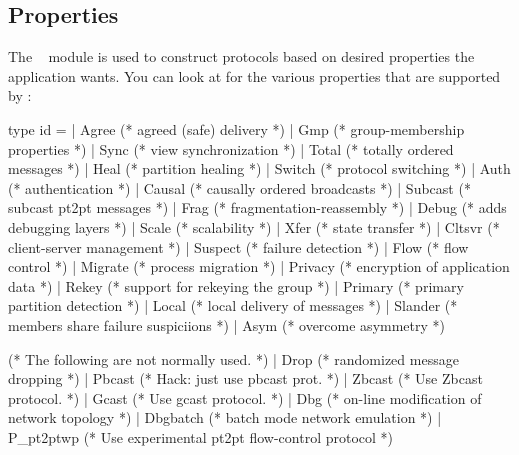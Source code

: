 %
%
%
\subsection{Properties}
\label{sec:properties}

The \ensemble\  module is used to construct protocols based on
desired properties the application wants.  You can look at 
for the various properties that are supported by \ensemble:
\begin{codebox}
type id =
  | Agree       (* agreed (safe) delivery *)
  | Gmp	        (* group-membership properties *)
  | Sync        (* view synchronization *)
  | Total       (* totally ordered messages *)
  | Heal        (* partition healing *)
  | Switch      (* protocol switching *)
  | Auth        (* authentication *)
  | Causal      (* causally ordered broadcasts *)
  | Subcast     (* subcast pt2pt messages *)
  | Frag        (* fragmentation-reassembly *)
  | Debug       (* adds debugging layers *)
  | Scale       (* scalability *)
  | Xfer        (* state transfer *)
  | Cltsvr      (* client-server management *)
  | Suspect     (* failure detection *)
  | Flow        (* flow control *)
  | Migrate     (* process migration *)
  | Privacy     (* encryption of application data *)
  | Rekey       (* support for rekeying the group *)
  | Primary     (* primary partition detection *)
  | Local       (* local delivery of messages *)
  | Slander     (* members share failure suspiciions *)
  | Asym        (* overcome asymmetry *)

    (* The following are not normally used.
     *)
  | Drop        (* randomized message dropping *)
  | Pbcast      (* Hack: just use pbcast prot. *)
  | Zbcast      (* Use Zbcast protocol. *)
  | Gcast       (* Use gcast protocol. *)
  | Dbg         (* on-line modification of network topology *)
  | Dbgbatch    (* batch mode network emulation *)
  | P_pt2ptwp   (* Use experimental pt2pt flow-control protocol *)
\end{codebox}

